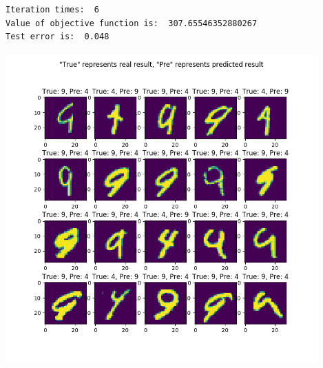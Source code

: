 \documentclass[letterpaper,11pt]{article}
\begin{document}
\begin{spacing}{1.2}
\begin{lstlisting}
Iteration times:  6
Value of objective function is:  307.65546352880267
Test error is:  0.048
\end{lstlisting}

\includegraphics[width=4.72in,height=4.72in]{missclassified.png}

\end{spacing}
\end{document}
